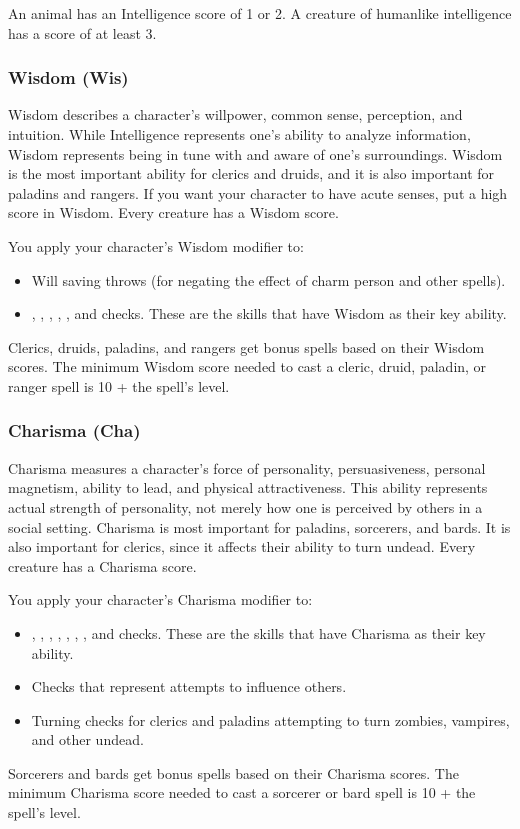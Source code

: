 An animal has an Intelligence score of 1 or 2. A creature of humanlike intelligence 
has a score of at least 3.

\subsubsection{Wisdom (Wis)}

Wisdom describes a character's willpower, common sense, perception, and intuition. 
While Intelligence represents one's ability to analyze information, Wisdom represents 
being in tune with and aware of one's surroundings. Wisdom is the most important 
ability for clerics and druids, and it is also important for paladins and rangers. 
If you want your character to have acute senses, put a high score in Wisdom. Every 
creature has a Wisdom score.

You apply your character's Wisdom modifier to:
\begin{itemize}
\item Will saving throws (for negating the effect of charm person and other spells).
\item {}, , , , , and  checks. These are the 
skills that have Wisdom as their key ability.
\end{itemize}
Clerics, druids, paladins, and rangers get bonus spells based on their Wisdom scores. 
The minimum Wisdom score needed to cast a cleric, druid, paladin, or ranger spell 
is 10 + the spell's level.

\subsubsection{Charisma (Cha)}

Charisma measures a character's force of personality, persuasiveness, personal 
magnetism, ability to lead, and physical attractiveness. This ability represents 
actual strength of personality, not merely how one is perceived by others in a 
social setting. Charisma is most important for paladins, sorcerers, and bards. 
It is also important for clerics, since it affects their ability to turn undead. 
Every creature has a Charisma score.

You apply your character's Charisma modifier to:
\begin{itemize}
\item {}, , , , , , , 
and  checks. These are the skills that have Charisma as their key 
ability.
\item Checks that represent attempts to influence others. 
\item Turning checks for clerics and paladins attempting to turn zombies, vampires, and 
other undead.
\end{itemize}
Sorcerers and bards get bonus spells based on their Charisma scores. The minimum 
Charisma score needed to cast a sorcerer or bard spell is 10 + the spell's level.

